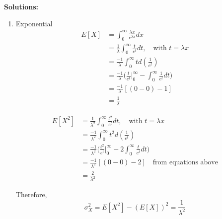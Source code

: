 \documentclass[UTF8]{article}
\begin{document}
    \textbf{Solutions:}
    
    \begin{enumerate}
        \item Exponential
        \begin{equation*}
          \begin{split}
             E[X] & = \int_{0}^{\infty}\frac{\lambda x}{e^{\lambda x}}dx\\
               & = \frac{1}{\lambda}\int_{0}^{\infty}\frac{t}{e^t}dt,\quad\text{with $t=\lambda x$}\\
               &=\frac{-1}{\lambda}\int_{0}^{\infty}td(\frac{1}{e^t})\\
               & =\frac{-1}{\lambda}\bigg(\frac{t}{e^t}\bigg|^\infty_0-\int_{0}^{\infty}\frac{1}{e^t}dt\bigg)\\
               &=\frac{-1}{\lambda}[(0-0)-1]\\
               &=\frac{1}{\lambda}
          \end{split}
        \end{equation*}

        \begin{equation*}
          \begin{split}
             E[X^2] &=\frac{1}{\lambda^2}\int_{0}^{\infty}\frac{t^2}{e^t}dt,\quad\text{with $t=\lambda x$}\\
               &=\frac{-1}{\lambda^2}\int_{0}^{\infty}t^2d(\frac{1}{e^t})\\
               &=\frac{-1}{\lambda^2}\bigg(\frac{t^2}{e^t}\bigg|^\infty_0-2\int_{0}^{\infty}\frac{t}{e^t}dt\bigg)\\
               &=\frac{-1}{\lambda^2}[(0-0)-2]\quad\text{from equations above}\\
               &=\frac{2}{\lambda^2}
          \end{split}
        \end{equation*}

        Therefore, 
        \begin{equation*}
            \sigma^2_X= E[X^2]-(E[X])^2=\frac{1}{\lambda^2}
        \end{equation*}


\end{enumerate}
\end{document}
